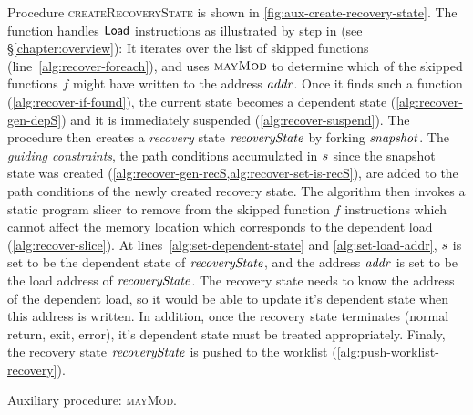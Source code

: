 Procedure \textsc{createRecoveryState} is shown in
\ref{fig:aux-create-recovery-state}. The function handles $\mathsf{Load}$
instructions as illustrated by step  in 
(see \S\ref{chapter:overview}):
It iterates over the list of skipped functions (line~\ref{alg:recover-foreach}),
and uses $\textsc{mayMod}$ to determine which of the skipped
functions $f$ might have written to the address $\mathit{addr}$. Once it finds
such a function (\cref{alg:recover-if-found}), the current state
becomes a dependent state (\cref{alg:recover-gen-depS}) and it is
immediately suspended (\cref{alg:recover-suspend}). 
The procedure then creates a \emph{recovery} state $\mathit{recoveryState}$ by
forking $\mathit{snapshot}$.
The \textit{guiding constraints}, \ie  the path conditions accumulated in $s$
since the snapshot state was created (\cref{alg:recover-gen-recS,alg:recover-set-is-recS}),
are added to the path conditions of the newly created recovery state.
The algorithm then invokes a static program slicer to remove from the
skipped function $f$ instructions which cannot affect the memory location which corresponds to
the dependent load (\cref{alg:recover-slice}).
At lines~\ref{alg:set-dependent-state} and \ref{alg:set-load-addr},
$s$ is set to be the dependent state of $\mathit{recoveryState}$,
and the address $\mathit{addr}$ is set to be the load address of $\mathit{recoveryState}$.
The recovery state needs to know the address of the dependent load,
so it would be able to update it's dependent state when this address is written.
In addition, once the recovery state terminates (normal return, exit, error),
it's dependent state must be treated appropriately.
Finaly, the recovery state $\mathit{recoveryState}$ is pushed to the worklist (\cref{alg:push-worklist-recovery}).

\begin{algorithm}
  \caption{Auxiliary procedure: \textsc{mayMod}.
  \label{fig:aux-may-mod}}
\begin{algorithmic}[1]

     \label{alg:maymod-static}
       \label{alg:maymod-dynamic}
         \State {}
       \EndIf
    \EndIf
  \EndFor
  \State {}
\EndFunction

\end{algorithmic}
\end{algorithm}

